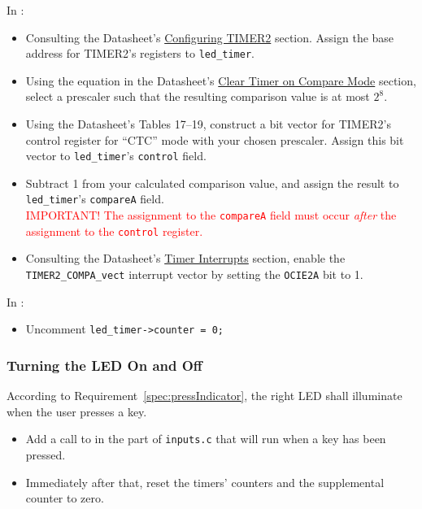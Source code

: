 In :
\begin{itemize}
    \item Consulting the Datasheet's \href{https://cow-pi.readthedocs.io/en/latest/microcontroller.html#configuring-timer2}{Configuring TIMER2} section.
        Assign the base address for TIMER2's registers to \lstinline{led_timer}.
    \item Using the equation in the Datasheet's \href{https://cow-pi.readthedocs.io/en/latest/microcontroller.html#clear-timer-on-compare-mode}{Clear Timer on Compare Mode} section,
        select a prescaler such that the resulting comparison value is at most $2^8$.
    \item Using the Datasheet's Tables 17--19, construct a bit vector for TIMER2's control register for ``CTC'' mode with your chosen prescaler.
        Assign this bit vector to \lstinline{led_timer}'s \lstinline{control} field.
    \item Subtract 1 from your calculated comparison value, and assign the result to \lstinline{led_timer}'s \lstinline{compareA} field. \\
        \textcolor{red}{IMPORTANT! The assignment to the \lstinline{compareA} field must occur \textit{after} the assignment to the \lstinline{control} register.}
    \item Consulting the Datasheet's \href{https://cow-pi.readthedocs.io/en/latest/microcontroller.html#timer-interrupts}{Timer Interrupts} section, enable the \lstinline{TIMER2_COMPA_vect} interrupt vector by setting the \lstinline{OCIE2A} bit to 1.
\end{itemize}

In :

\begin{itemize}
    \item Uncomment \lstinline{led_timer->counter = 0;}
\end{itemize}

\subsubsection{Turning the LED On and Off}

According to Requirement~\ref{spec:pressIndicator}, the right LED shall illuminate when the user presses a key.
\begin{itemize}
    \item Add a call to  in the part of \lstinline{inputs.c} that will run when a key has been pressed.
    \item Immediately after that, reset the timers' counters and the supplemental counter to zero.
\end{itemize}

